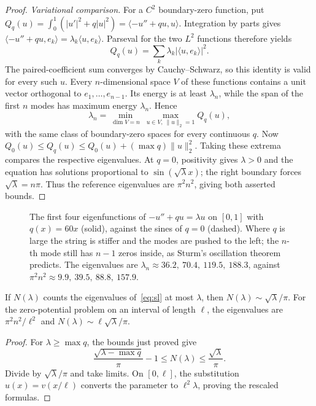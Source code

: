 \begin{proof}
\emph{Variational comparison.} For a $C^2$ boundary-zero function, put
$Q_q(u)=\int_0^1(|u'|^2+q|u|^2)=\langle-u''+qu,u\rangle$.
Integration by parts gives $\langle-u''+qu,e_k\rangle=\lambda_k\langle u,e_k\rangle$. Parseval for the two $L^2$ functions therefore yields
\[
Q_q(u)=\sum_k\lambda_k|\langle u,e_k\rangle|^2.
\]
The paired-coefficient sum converges by Cauchy--Schwarz, so this identity is valid for every such $u$. Every $n$-dimensional space $V$ of these functions contains a unit vector orthogonal to $e_1,\ldots,e_{n-1}$. Its energy is at least $\lambda_n$, while the span of the first $n$ modes has maximum energy $\lambda_n$. Hence
\[
\lambda_n=\min_{\dim V=n}\ \max_{u\in V,\ \|u\|_2=1}Q_q(u),
\]
with the same class of boundary-zero spaces for every continuous $q$.
Now $Q_0(u)\le Q_q(u)\le Q_0(u)+(\max q)\|u\|_2^2$. Taking these extrema compares the respective eigenvalues. At $q=0$, positivity gives $\lambda>0$ and the equation has solutions proportional to $\sin(\sqrt\lambda x)$; the right boundary forces $\sqrt\lambda=n\pi$. Thus the reference eigenvalues are $\pi^2n^2$, giving both asserted bounds.
\end{proof}

\begin{figure}[ht]
\centering
{}
\caption{The first four eigenfunctions of $-u''+qu=\lambda u$ on $[0,1]$ with $q(x)=60x$ (solid), against the sines of $q=0$ (dashed). Where $q$ is large the string is stiffer and the modes are
pushed to the left; the $n$-th mode still has $n-1$ zeros inside, as Sturm's oscillation theorem predicts. The eigenvalues are $\lambda_n\approx36.2,\ 70.4,\ 119.5,\ 188.3$, against $\pi^2n^2\approx9.9,\ 39.5,\ 88.8,\ 157.9$.}
\label{fig:sturm}
\end{figure}

\begin{corollary}\label{cor:weyllaw}
If $N(\lambda)$ counts the eigenvalues of~\eqref{eq:sl} at most $\lambda$, then $N(\lambda)\sim\sqrt\lambda/\pi$. For the zero-potential problem on an interval of length $\ell$, the eigenvalues are $\pi^2n^2/\ell^2$ and $N(\lambda)\sim\ell\sqrt\lambda/\pi$.
\end{corollary}
\begin{proof}
For $\lambda\ge\max q$, the bounds just proved give
\[
\frac{\sqrt{\lambda-\max q}}\pi-1
\le N(\lambda)\le\frac{\sqrt\lambda}\pi.
\]
Divide by $\sqrt\lambda/\pi$ and take limits. On $[0,\ell]$, the substitution $u(x)=v(x/\ell)$ converts the parameter to $\ell^2\lambda$, proving the rescaled formulas.
\end{proof}


